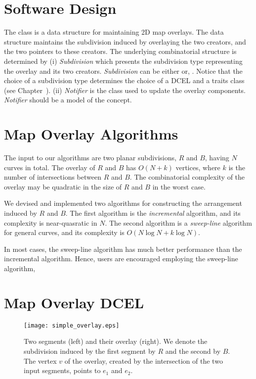 \begin{ccTexOnly}

\section{Software Design}
The  class 
is a data structure for maintaining 2D map overlays.
The data structure maintains the subdivision induced by overlaying 
the two creators, and the two pointers to these creators. 
The underlying combinatorial structure is determined by
(i) {\it Subdivision} which presents the subdivision type 
representing the overlay and its two creators. 
{\it Subdivision} can be either  or, 
 .
Notice that the choice of a subdivision type determines the choice 
of a DCEL and a traits class (see Chapter~).
(ii) {\it Notifier} is the class used to update the overlay components. 
{\it Notifier} should be a model of the 
 concept.

\section{Map Overlay Algorithms}
\label{sec:algorithms}
The input to our algorithms are two planar subdivisions, 
$R$ and $B$, having $N$ curves in total. 
The overlay of $R$ and $B$ has $O(N+k)$ vertices, 
where $k$ is the number of intersections between $R$ and $B$.
The combinatorial complexity of the overlay may be quadratic 
in the size of $R$ and $B$ in the worst case.

We devised and implemented two algorithms for constructing the 
arrangement induced by $R$ and $B$.
The first algorithm is the {\em incremental} algorithm, 
and its complexity is near-quasratic in $N$. 
The second algorithm is a {\em sweep-line} algorithm 
for general curves, and its complexity is $O(N\log{N} + k\log{N})$.

In most cases, the sweep-line algorithm has much better performance 
than the incremental algorithm. Hence, users are encouraged employing 
the sweep-line algorithm,

\section{Map Overlay DCEL}
\label{sec:dcel}

\begin{figure}[h]
    \begin{ccTexOnly}
        \centerline{
           \texttt{[image: simple\_overlay.eps]}
           }
    \end{ccTexOnly}
\caption{Two segments (left) and their overlay (right). 
We denote the subdivision induced by the first segment by $R$ and the second by $B$. 
The vertex $v$ of the overlay, created by the intersection of the two input segments, 
points to $e_1$ and $e_2$.}
\label{fig:simple_overlay_example}
\end{figure}


\end{ccTexOnly}
